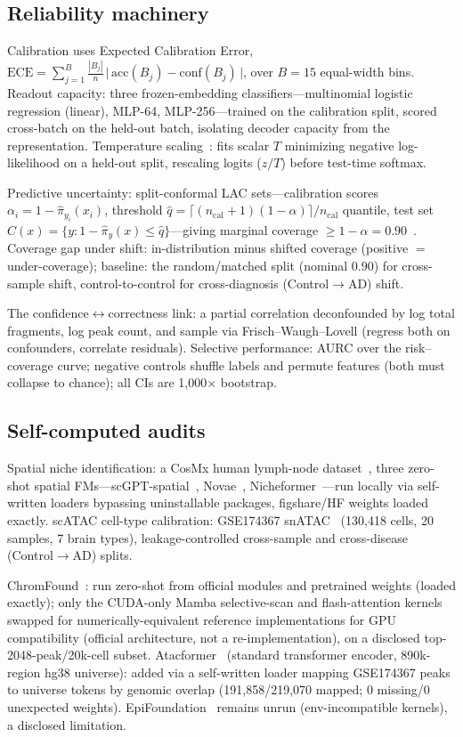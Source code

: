 \documentclass[journal]{IEEEtran}
\begin{document}
\subsection{Reliability machinery}
Calibration uses Expected Calibration Error, $\mathrm{ECE}=\sum_{j=1}^{B}\frac{|B_j|}{n}\,\big|\,\mathrm{acc}(B_j)-\mathrm{conf}(B_j)\,\big|$, over $B{=}15$ equal-width bins. Readout capacity: three frozen-embedding classifiers---multinomial logistic regression (linear), MLP-64, MLP-256---trained on the calibration split, scored cross-batch on the held-out batch, isolating decoder capacity from the representation. Temperature scaling~\cite{guo2017}: fits scalar $T$ minimizing negative log-likelihood on a held-out split, rescaling logits ($z/T$) before test-time softmax.

Predictive uncertainty: split-conformal LAC sets---calibration scores $\alpha_i = 1-\hat\pi_{y_i}(x_i)$, threshold $\hat q = \lceil (n_{\mathrm{cal}}{+}1)(1{-}\alpha)\rceil/n_{\mathrm{cal}}$ quantile, test set $C(x)=\{y:1-\hat\pi_y(x)\le\hat q\}$---giving marginal coverage $\ge 1-\alpha=0.90$~\cite{angelopoulos2023}. Coverage gap under shift: in-distribution minus shifted coverage (positive $=$ under-coverage); baseline: the random/matched split (nominal $0.90$) for cross-sample shift, control-to-control for cross-diagnosis (Control$\to$AD) shift.

The confidence$\leftrightarrow$correctness link: a partial correlation deconfounded by log total fragments, log peak count, and sample via Frisch--Waugh--Lovell (regress both on confounders, correlate residuals). Selective performance: AURC over the risk--coverage curve; negative controls shuffle labels and permute features (both must collapse to chance); all CIs are 1{,}000$\times$ bootstrap.
\subsection{Self-computed audits}
Spatial niche identification: a CosMx human lymph-node dataset~\cite{wang2026niche}, three zero-shot spatial FMs---scGPT-spatial~\cite{scgptspatial2025}, Novae~\cite{novae2025}, Nicheformer~\cite{nicheformer2025}---run locally via self-written loaders bypassing uninstallable packages, figshare/HF weights loaded exactly. scATAC cell-type calibration: GSE174367 snATAC~\cite{morabito2021} (130{,}418 cells, 20 samples, 7 brain types), leakage-controlled cross-sample and cross-disease (Control$\to$AD) splits.

ChromFound~\cite{chromfound2025}: run zero-shot from official modules and pretrained weights (loaded exactly); only the CUDA-only Mamba selective-scan and flash-attention kernels swapped for numerically-equivalent reference implementations for GPU compatibility (official architecture, not a re-implementation), on a disclosed top-2048-peak/20k-cell subset. Atacformer~\cite{atacformer2024} (standard transformer encoder, 890k-region hg38 universe): added via a self-written loader mapping GSE174367 peaks to universe tokens by genomic overlap (191{,}858/219{,}070 mapped; 0 missing/0 unexpected weights). EpiFoundation~\cite{epifoundation2025} remains unrun (env-incompatible kernels), a disclosed limitation.
\end{document}
